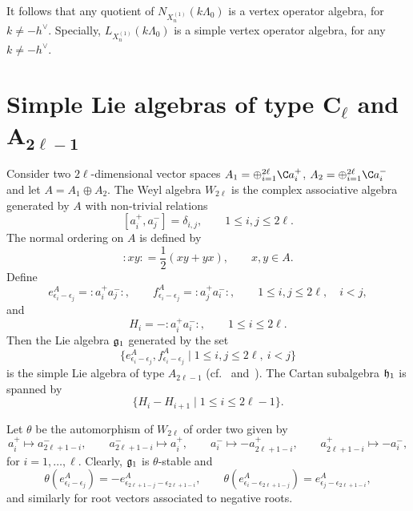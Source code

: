 \documentclass[pdftex]{sigma}
\begin{document}
It follows that any quotient of $N_{X_{n} ^{(1)}}(k \Lambda _0)$ is
a vertex operator algebra, for $k \neq - h^{\vee}$. Specially,
$L_{X_{n} ^{(1)}}(k \Lambda _0)$ is a simple vertex operator
algebra, for any $k \neq - h^{\vee}$.



\section[Simple Lie algebras of type $C_{\ell}$ and $A_{2\ell -1}$]{Simple Lie algebras of type $\boldsymbol{C_{\ell}}$ and $\boldsymbol{A_{2\ell -1}}$}

Consider two $2 \ell$-dimensional vector spaces $A_1 = \oplus
_{i=1} ^{2 \ell}{\C} a_i ^+$, $ A_2 = \oplus _{i=1}^ {2 \ell} {\C}
a_i^-$ and let $A=A_1 {\oplus} A_2$. The Weyl algebra $W_{2 \ell}$ is
the complex associative algebra generated by $A$ with non-trivial
relations
\[
[a_i ^+,a_j^-]=\delta_{i,j} , \qquad 1 \le i,j \le 2 \ell.
\]
%
The normal ordering on $A$ is def\/ined by
\[
:\!xy\!:    = \frac 1 2 (xy+yx),  \qquad x,y \in A .
\]
Def\/ine
\[
e_{\epsilon_i-\epsilon_j}^A=  :\!a_i ^+ a_j^-\!:, \qquad
f_{\epsilon_i-\epsilon_j}^A=  :\!a_j ^+ a_i^-\!:, \qquad 1 \le i,j
\le 2 \ell, \quad i<j,
\]
and
\[
H_i=-:\!a_i ^+ a_i^-\!:,  \qquad 1 \le i \le 2 \ell.
\]
Then the Lie algebra $\frak g _1$ generated by the set
\[
\big\{ e_{\epsilon_i-\epsilon_j}^A, f_{\epsilon_i-\epsilon_j}^A \; \vert
\; 1 \le i,j \le 2 \ell, \ i < j \big\}
\]
is the simple Lie algebra of type $A_{2 \ell -1}$ (cf.~\cite{Bou}
and~\cite{FF}). The Cartan subalgebra $\frak h _1$ is spanned by
\[
\{ H_i - H_{i+1}  \; \vert \; 1 \le i \le 2 \ell -1 \}.
\]


Let $\theta$ be the automorphism of $W_{2 \ell}$ of order two given
by
%
\[  a_{i} ^+ \mapsto  a_{2\ell+1-i} ^{-}, \qquad a_{2\ell+1-i} ^-
\mapsto  a_{i} ^{+}, \qquad a_{i} ^-  \mapsto - a_{2\ell+1-i} ^+,
\qquad a_{2\ell+1-i} ^+ \mapsto - a_{i} ^-,\]
for $i =1, \dots, \ell$. Clearly, $\frak g _1$ is $\theta$-stable
and \[
\theta (e_{\epsilon_i-\epsilon_j}^A)=- e_{\epsilon_{2\ell
+1-j}-\epsilon_{2\ell +1-i}}^A, \qquad \theta
(e_{\epsilon_i-\epsilon_{2\ell +1-j}}^A)=
e_{\epsilon_{j}-\epsilon_{2\ell +1-i}}^A,
\]
%
and similarly for root vectors associated to negative roots.
\end{document}
